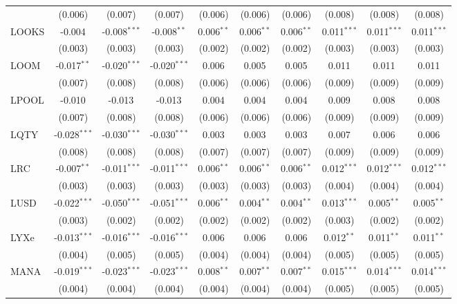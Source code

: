 \begin{table}[!htbp]
\begin{tabular}{@{\extracolsep{5pt}}lccccccccc}
  & (0.006) & (0.007) & (0.007) & (0.006) & (0.006) & (0.006) & (0.008) & (0.008) & (0.008) \\
 LOOKS & -0.004$^{}$ & -0.008$^{***}$ & -0.008$^{**}$ & 0.006$^{**}$ & 0.006$^{**}$ & 0.006$^{**}$ & 0.011$^{***}$ & 0.011$^{***}$ & 0.011$^{***}$ \\
  & (0.003) & (0.003) & (0.003) & (0.002) & (0.002) & (0.002) & (0.003) & (0.003) & (0.003) \\
 LOOM & -0.017$^{**}$ & -0.020$^{***}$ & -0.020$^{***}$ & 0.006$^{}$ & 0.005$^{}$ & 0.005$^{}$ & 0.011$^{}$ & 0.011$^{}$ & 0.011$^{}$ \\
  & (0.007) & (0.008) & (0.008) & (0.006) & (0.006) & (0.006) & (0.009) & (0.009) & (0.009) \\
 LPOOL & -0.010$^{}$ & -0.013$^{}$ & -0.013$^{}$ & 0.004$^{}$ & 0.004$^{}$ & 0.004$^{}$ & 0.009$^{}$ & 0.008$^{}$ & 0.008$^{}$ \\
  & (0.007) & (0.008) & (0.008) & (0.006) & (0.006) & (0.006) & (0.009) & (0.009) & (0.009) \\
 LQTY & -0.028$^{***}$ & -0.030$^{***}$ & -0.030$^{***}$ & 0.003$^{}$ & 0.003$^{}$ & 0.003$^{}$ & 0.007$^{}$ & 0.006$^{}$ & 0.006$^{}$ \\
  & (0.008) & (0.008) & (0.008) & (0.007) & (0.007) & (0.007) & (0.009) & (0.009) & (0.009) \\
 LRC & -0.007$^{**}$ & -0.011$^{***}$ & -0.011$^{***}$ & 0.006$^{**}$ & 0.006$^{**}$ & 0.006$^{**}$ & 0.012$^{***}$ & 0.012$^{***}$ & 0.012$^{***}$ \\
  & (0.003) & (0.003) & (0.003) & (0.003) & (0.003) & (0.003) & (0.004) & (0.004) & (0.004) \\
 LUSD & -0.022$^{***}$ & -0.050$^{***}$ & -0.051$^{***}$ & 0.006$^{**}$ & 0.004$^{**}$ & 0.004$^{**}$ & 0.013$^{***}$ & 0.005$^{**}$ & 0.005$^{**}$ \\
  & (0.003) & (0.002) & (0.002) & (0.002) & (0.002) & (0.002) & (0.003) & (0.002) & (0.002) \\
 LYXe & -0.013$^{***}$ & -0.016$^{***}$ & -0.016$^{***}$ & 0.006$^{}$ & 0.006$^{}$ & 0.006$^{}$ & 0.012$^{**}$ & 0.011$^{**}$ & 0.011$^{**}$ \\
  & (0.004) & (0.005) & (0.005) & (0.004) & (0.004) & (0.004) & (0.005) & (0.005) & (0.005) \\
 MANA & -0.019$^{***}$ & -0.023$^{***}$ & -0.023$^{***}$ & 0.008$^{**}$ & 0.007$^{**}$ & 0.007$^{**}$ & 0.015$^{***}$ & 0.014$^{***}$ & 0.014$^{***}$ \\
  & (0.004) & (0.004) & (0.004) & (0.004) & (0.004) & (0.004) & (0.005) & (0.005) & (0.005) \\

\end{tabular}
\end{table}
